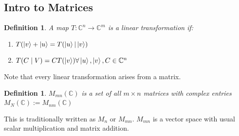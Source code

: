 \documentclass[12pt]{article}
\theoremstyle{plain}
\theoremstyle{nonumberplain}
\theoremstyle{plain}
\newtheorem{definition}[lemma]{Definition}
\theoremstyle{nonumberplain}
\newcommand\1{{\bf 1}}
\newcommand{\C}{\mathbb{C}} %
\newcommand{\<}{\left\langle}
\renewcommand{\>}{\right\rangle}
\begin{document}

\subsection{Intro to Matrices}

\begin{definition}
A map $T: \C^n\longrightarrow\C^m$ is a linear transformation if:
\begin{enumerate}
	\item $T(\ket{v}+\ket{u}=T(\ket{u}|\ket{v})$
	\item $T(C\mid V)=CT(\ket{v}) \forall \ket{u},\ket{v}, C\in\C^n$
\end{enumerate}
\end{definition}
Note that every linear transformation arises from a matrix.
\begin{definition}
$M_{mn}(\C)$ is a set of all $m\times n$ matrices with complex entries $M_N(\C):=M_{nm}(\C)$
\end{definition}
This is traditionally written as $M_n$ or $M_{mn}$. $M_{mn}$ is a vector space with usual scalar multiplication and matrix addition.
\end{document}
